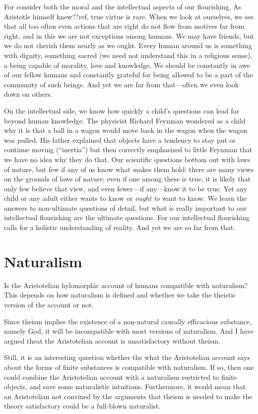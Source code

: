 For consider both the moral and the intellectual aspects of our flourishing. As Aristotle himself knew??ref, true virtue is 
rare. When we look at ourselves, we see that all too often even actions that are right do not flow from motives far from 
right, and in this we are not exceptions among humans. We may have friends, but we do not cherish them nearly as we ought. 
Every human around us is something with dignity, something sacred (we need not understand this in a religious sense), a being capable of morality, love and knowledge. We should be constantly in awe of our fellow humans and constantly grateful for being allowed 
to be a part of the community of such beings. And yet we are far from that---often we even look down on others. 

On the intellectual side, we know how quickly a child's questions can lead far beyond human knowledge. The physicist 
Richard Feynman wondered as a child why it is that a ball in a wagon would move back in the wagon when the wagon was 
pulled. His father explained that objects have a tendency to stay put or continue moving (``inertia'') but then correctly
emphasized to little Feynman that we have no idea why they do that. Our scientific questions bottom out with laws of nature,
but few if any of us know what makes them hold: there are many views on the grounds of laws of nature; even if one among these is 
true, it is likely that only few believe that view, and even fewer---if any---know it to be true. Yet any child or any adult 
either wants to know or \textit{ought to} want to know. We learn the answers to non-ultimate questions of detail, but what is 
really important to our intellectual flourishing are the ultimate questions. For our intellectual flourishing calls for a holistic
understanding of reality. And yet we are so far from that.

\section{Naturalism}
Is the Aristotelian hylomorphic account of humans compatible with naturalism? This depends on how naturalism
is defined and whether we take the theistic version of the account or not.

Since theism implies the existence of a non-natural causally efficacious substance, namely God, it will be incompatible
with most versions of naturalism. And I have argued theat the Aristotelian account is unsatisfactory without
theism. 

Still, it is an interesting question whether the what the Aristotelian account says about the forms of finite
substances is compatible with naturalism. If so, then one could combine the Aristotelian account with 
a naturalism restricted to finite objects, and save some naturalistic intuitions. Furthermore, it would mean
that an Aristotelian not convined by the arguments that theism is needed to make the theory satisfactory could
be a full-blown naturalist.

